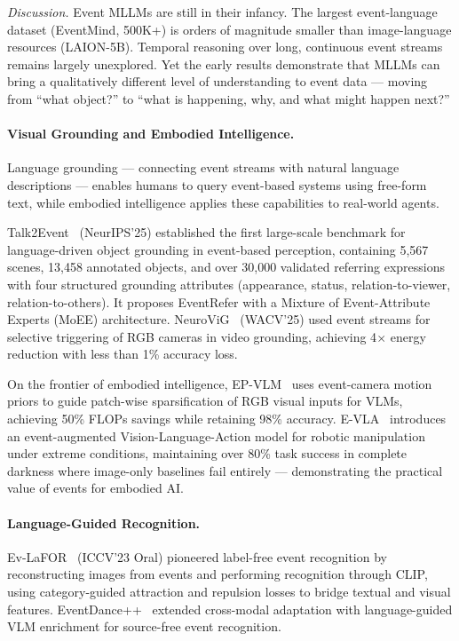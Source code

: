 \textit{Discussion.} Event MLLMs are still in their infancy. The largest event-language dataset (EventMind, 500K+) is orders of magnitude smaller than image-language resources (LAION-5B). Temporal reasoning over long, continuous event streams remains largely unexplored. Yet the early results demonstrate that MLLMs can bring a qualitatively different level of understanding to event data --- moving from ``what object?'' to ``what is happening, why, and what might happen next?''

\paragraph{Visual Grounding and Embodied Intelligence.}
Language grounding --- connecting event streams with natural language descriptions --- enables humans to query event-based systems using free-form text, while embodied intelligence applies these capabilities to real-world agents.

Talk2Event~\cite{zheng2025talk2event} (NeurIPS'25) established the first large-scale benchmark for language-driven object grounding in event-based perception, containing 5,567 scenes, 13,458 annotated objects, and over 30,000 validated referring expressions with four structured grounding attributes (appearance, status, relation-to-viewer, relation-to-others). It proposes EventRefer with a Mixture of Event-Attribute Experts (MoEE) architecture. NeuroViG~\cite{li2025neurovig} (WACV'25) used event streams for selective triggering of RGB cameras in video grounding, achieving 4$\times$ energy reduction with less than 1\% accuracy loss.

On the frontier of embodied intelligence, EP-VLM~\cite{yang2025epvlm} uses event-camera motion priors to guide patch-wise sparsification of RGB visual inputs for VLMs, achieving 50\% FLOPs savings while retaining 98\% accuracy. E-VLA~\cite{miao2026evla} introduces an event-augmented Vision-Language-Action model for robotic manipulation under extreme conditions, maintaining over 80\% task success in complete darkness where image-only baselines fail entirely --- demonstrating the practical value of events for embodied AI.

\paragraph{Language-Guided Recognition.}
Ev-LaFOR~\cite{cho2023evlafor} (ICCV'23 Oral) pioneered label-free event recognition by reconstructing images from events and performing recognition through CLIP, using category-guided attraction and repulsion losses to bridge textual and visual features. EventDance++~\cite{zheng2024eventdancepp} extended cross-modal adaptation with language-guided VLM enrichment for source-free event recognition.


